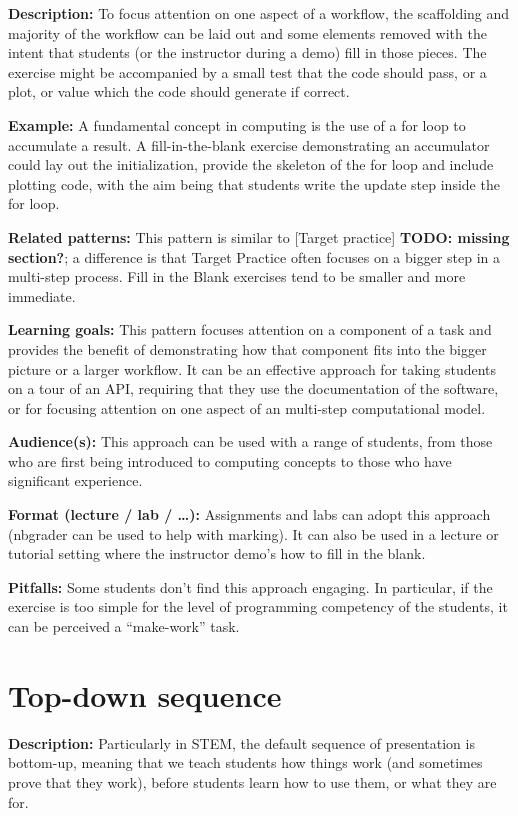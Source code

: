 \documentclass[]{book}
\begin{document}
\textbf{Description:} To focus attention on one aspect of a workflow,
the scaffolding and majority of the workflow can be laid out and some
elements removed with the intent that students (or the instructor during
a demo) fill in those pieces. The exercise might be accompanied by a
small test that the code should pass, or a plot, or value which the code
should generate if correct.

\textbf{Example:} A fundamental concept in computing is the use of a for
loop to accumulate a result. A fill-in-the-blank exercise demonstrating
an accumulator could lay out the initialization, provide the skeleton of
the for loop and include plotting code, with the aim being that students
write the update step inside the for loop.

\textbf{Related patterns:} This pattern is similar to {[}Target
practice{]} \textbf{TODO: missing section?}; a difference is that Target
Practice often focuses on a bigger step in a multi-step process. Fill in
the Blank exercises tend to be smaller and more immediate.

\textbf{Learning goals:} This pattern focuses attention on a component
of a task and provides the benefit of demonstrating how that component
fits into the bigger picture or a larger workflow. It can be an
effective approach for taking students on a tour of an API, requiring
that they use the documentation of the software, or for focusing
attention on one aspect of an multi-step computational model.

\textbf{Audience(s):} This approach can be used with a range of
students, from those who are first being introduced to computing
concepts to those who have significant experience.

\textbf{Format (lecture / lab / \ldots{}):} Assignments and labs can
adopt this approach (nbgrader can be used to help with marking). It can
also be used in a lecture or tutorial setting where the instructor
demo's how to fill in the blank.

\textbf{Pitfalls:} Some students don't find this approach engaging. In
particular, if the exercise is too simple for the level of programming
competency of the students, it can be perceived a ``make-work'' task.

\hypertarget{top-down-sequence}{\section{Top-down
sequence}\label{top-down-sequence}}

\textbf{Description:} Particularly in STEM, the default sequence of
presentation is bottom-up, meaning that we teach students how things
work (and sometimes prove that they work), before students learn how to
use them, or what they are for.
\end{document}
